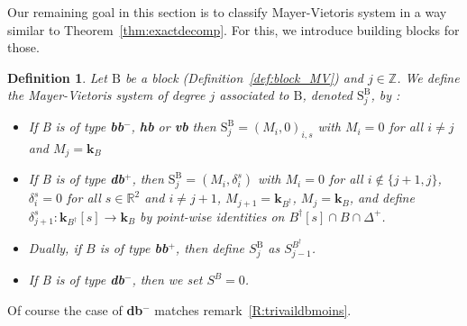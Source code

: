 \documentclass[a4paper, english, 11pt]{article}
\newcommand{\kk}[0]{\textbf{k}}
\newcommand{\0}{\vec{0}}
\newcommand{\R}[0]{\mathbb{R}}
\newcommand{\Z}[0]{\mathbb{Z}}
\newtheorem{defi}[prop]{Definition}
\begin{document}
Our remaining goal in this section is to classify Mayer-Vietoris system in a way similar to Theorem~\ref{thm:exactdecomp}. For this, we introduce building blocks for those.
\begin{defi}\label{D:blocksmodulesforMV}
Let $\text{B}$ be a block (Definition~\ref{def:block_MV}) and $j\in \Z$. We define the Mayer-Vietoris system of degree $j$ associated to $\text{B}$, denoted $\text{S}^\text{B}_j$,   by : 

\begin{itemize}
    \item If B is of type \textbf{bb}$^-$, \textbf{hb} or \textbf{vb} then $\text{S}^\text{B}_j = (M_i,0)_{i,s}$ with $M_i = 0$ for all $i\not = j$ and $M_j = \kk_B$
    
    \item If B is of type \textbf{db}$^+$, then $\text{S}^\text{B}_j = (M_i,\delta_i^s)$ with $M_i = 0$ for all $i\not \in \{j+1,j\} $, $\delta_i^s=0$ for all $s\in \R^2$ and $i\not = j+1$,  $M_{j+1} = \kk_{B^\dag}$, $M_{j}= \kk_{B}$, and define $\delta_{j+1}^s : \kk_{B^\dag}[s] \to \kk_B$ by point-wise identities on $B^\dag [s]\cap B \cap \Delta^+$.

    \item Dually, if $B$ is of type \textbf{bb$^+$}, then define $S^{\text{B}}_j$ as $S^{B^\dag}_{j-1}$.
    \item If B is of type \textbf{db}$^{-}$, then we set $S^B=0$.
\end{itemize}  
\end{defi}
Of course the case of \textbf{db}$^{-}$ matches remark~\ref{R:trivaildbmoins}.
\end{document}
